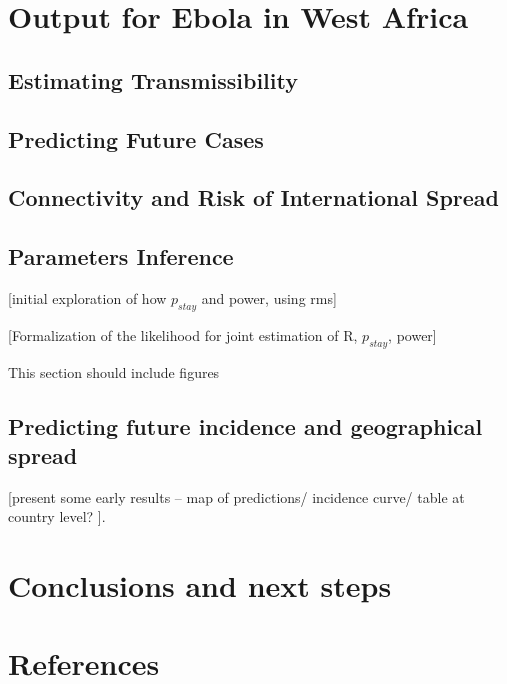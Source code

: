 \documentclass[11pt,]{article}
\begin{document}
\section{Output for Ebola in West Africa}\label{output-for-ebola-in-west-africa}



\subsection{Estimating Transmissibility}\label{estimating-transmissibility}

\subsection{Predicting Future Cases}\label{predicting-future-cases}

\subsection{Connectivity and Risk of International
Spread}\label{connectivity-and-risk-of-international-spread}

\subsection{Parameters Inference}
[initial exploration of how $p_{stay}$ and power, using rms]

[Formalization of the likelihood for joint estimation of R, $p_{stay}$, power]

This section should include figures

\subsection{Predicting future incidence and geographical spread}

[present some early results – map of predictions/ incidence curve/ table at country level? ].

\section{Conclusions and next steps}\label{sec:conclusions}







\newpage
\section*{References}

\end{document}
